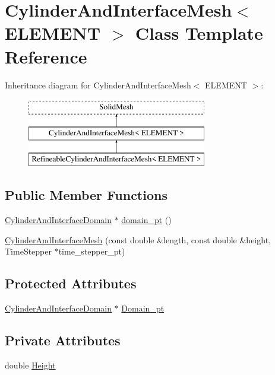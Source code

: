 \hypertarget{classCylinderAndInterfaceMesh}{}\section{Cylinder\+And\+Interface\+Mesh$<$ E\+L\+E\+M\+E\+NT $>$ Class Template Reference}
\label{classCylinderAndInterfaceMesh}
Inheritance diagram for Cylinder\+And\+Interface\+Mesh$<$ E\+L\+E\+M\+E\+NT $>$\+:\begin{figure}[H]
\begin{center}
\leavevmode
\includegraphics[height=3.000000cm]{classCylinderAndInterfaceMesh}
\end{center}
\end{figure}
\subsection*{Public Member Functions}
\begin{DoxyCompactItemize}
\item 
\hyperlink{classCylinderAndInterfaceDomain}{Cylinder\+And\+Interface\+Domain} $\ast$ \hyperlink{classCylinderAndInterfaceMesh_a924b3538d9f6c8b8524c317c5e2aa380}{domain\+\_\+pt} ()
\item 
\hyperlink{classCylinderAndInterfaceMesh_ab62eda41cc4a5516017b2662bcba8d17}{Cylinder\+And\+Interface\+Mesh} (const double \&length, const double \&height, Time\+Stepper $\ast$time\+\_\+stepper\+\_\+pt)
\end{DoxyCompactItemize}
\subsection*{Protected Attributes}
\begin{DoxyCompactItemize}
\item 
\hyperlink{classCylinderAndInterfaceDomain}{Cylinder\+And\+Interface\+Domain} $\ast$ \hyperlink{classCylinderAndInterfaceMesh_aa7b43c0cab4ffc92bb47813a8e255374}{Domain\+\_\+pt}
\end{DoxyCompactItemize}
\subsection*{Private Attributes}
\begin{DoxyCompactItemize}
\item 
double \hyperlink{classCylinderAndInterfaceMesh_a5ad81e65a9e9fb4c709a0c84f38216b1}{Height}
\end{DoxyCompactItemize}


